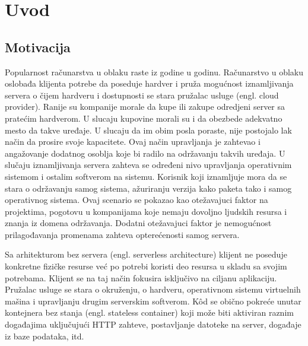 \documentclass[12pt,oneside]{memoir}
\begin{document}
\frontmatter
\naslovna
\komisija
\apstrakt
\tableofcontents*

\mainmatter

\chapter{Uvod}

\section{Motivacija}
Popularnost računarstva u oblaku raste iz godine u godinu. Računarstvo u oblaku oslobađa klijenta potrebe da poseduje hardver i pruža mogućnost iznamljivanja servera o čijem hardveru i dostupnosti se stara pružalac usluge (engl. cloud provider). Ranije su kompanije morale da kupe ili zakupe odredjeni server sa pratećim hardverom. U slucaju kupovine morali su i da obezbede adekvatno mesto da takve uređaje. U slucaju da im obim posla poraste, nije postojalo lak način da prosire svoje kapacitete. Ovaj način upravljanja je zahtevao i angažovanje dodatnog osoblja koje bi radilo na održavanju takvih uređaja. U slučaju iznamljivanja servera zahteva se određeni nivo upravljanja operativnim sistemom i ostalim softverom na sistemu. Korisnik koji iznamljuje mora da se stara o održavanju samog sistema, ažuriranju verzija kako paketa tako i samog operativnog sistema. Ovaj scenario se pokazao kao otežavajuci faktor na projektima, pogotovu u kompanijama koje nemaju dovoljno ljudskih resursa i znanja iz domena održavanja. Dodatni otežavajuci faktor je nemogućnost prilagođavanja promenama zahteva opterećenosti samog servera. 

Sa arhitekturom bez servera (engl. serverless architecture) klijent ne poseduje konkretne fizičke resurse već po potrebi koristi deo resursa u skladu sa svojim potrebama. Klijent se na taj način fokusira isključivo na ciljanu aplikaciju. Pružalac usluge se stara o okruženju, o hardveru, operativnom sistemu virtuelnih mašina i upravljanju drugim serverskim softverom. Kôd se obično pokreće unutar kontejnera bez stanja (engl. stateless container) koji može biti aktiviran raznim događajima uključujući HTTP zahteve, postavljanje datoteke na server, događaje iz baze podataka, itd.
\end{document}
